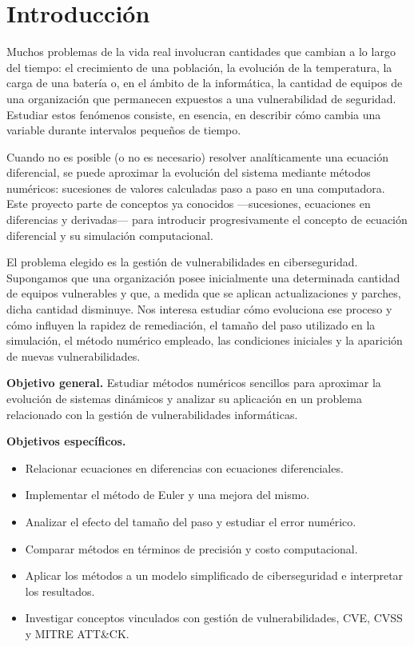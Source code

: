 \documentclass[11pt,a4paper]{article}
\begin{document}
\section{Introducción}

Muchos problemas de la vida real involucran cantidades que cambian a lo largo
del tiempo: el crecimiento de una población, la evolución de la temperatura,
la carga de una batería o, en el ámbito de la informática, la cantidad de
equipos de una organización que permanecen expuestos a una vulnerabilidad de
seguridad. Estudiar estos fenómenos consiste, en esencia, en describir cómo
cambia una variable durante intervalos pequeños de tiempo.

Cuando no es posible (o no es necesario) resolver analíticamente una ecuación
diferencial, se puede aproximar la evolución del sistema mediante métodos
numéricos: sucesiones de valores calculadas paso a paso en una computadora.
Este proyecto parte de conceptos ya conocidos ---sucesiones, ecuaciones en
diferencias y derivadas--- para introducir progresivamente el concepto de
ecuación diferencial y su simulación computacional.

El problema elegido es la gestión de vulnerabilidades en ciberseguridad.
Supongamos que una organización posee inicialmente una determinada cantidad de
equipos vulnerables y que, a medida que se aplican actualizaciones y parches,
dicha cantidad disminuye. Nos interesa estudiar cómo evoluciona ese proceso y
cómo influyen la rapidez de remediación, el tamaño del paso utilizado en la
simulación, el método numérico empleado, las condiciones iniciales y la
aparición de nuevas vulnerabilidades.

\textbf{Objetivo general.}
Estudiar métodos numéricos sencillos para aproximar la evolución de sistemas
dinámicos y analizar su aplicación en un problema relacionado con la gestión de
vulnerabilidades informáticas.

\textbf{Objetivos específicos.}
\begin{itemize}
  \item Relacionar ecuaciones en diferencias con ecuaciones diferenciales.
  \item Implementar el método de Euler y una mejora del mismo.
  \item Analizar el efecto del tamaño del paso y estudiar el error numérico.
  \item Comparar métodos en términos de precisión y costo computacional.
  \item Aplicar los métodos a un modelo simplificado de ciberseguridad e
        interpretar los resultados.
  \item Investigar conceptos vinculados con gestión de vulnerabilidades, CVE,
        CVSS y MITRE ATT\&CK.
\end{itemize}
\end{document}
